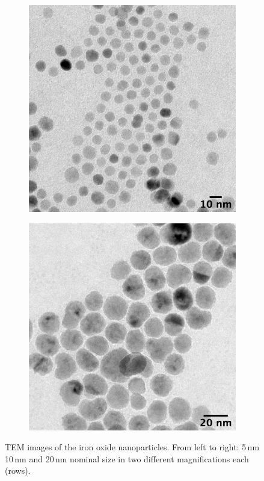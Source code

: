 \begin{figure}[tp]
\begin{subfigure}[b]{0.25\textwidth}
	\end{subfigure}
	\begin{subfigure}[b]{0.25\textwidth}
		\includegraphics[width=\linewidth]{images/temh10.png}
	\end{subfigure}
	\begin{subfigure}[b]{0.25\textwidth}
		\includegraphics[width=\linewidth]{images/temh20.png}
	\end{subfigure}
\caption[TEM images of iron oxide nanoparticle]{TEM images of the iron oxide nanoparticles. From left to right: 5\,nm 10\,nm and 20\,nm nominal size in two different magnifications each (rows).}
\label{fig:tem}
\end{figure}

